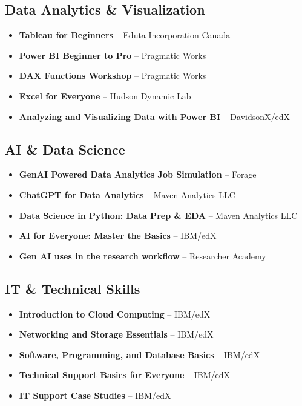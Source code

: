 \documentclass[a4paper,10pt]{article}
\begin{document}
\subsection{Data Analytics \& Visualization}
\begin{itemize}[noitemsep, leftmargin=*, topsep=0.2em]
    \item \textbf{Tableau for Beginners} -- Eduta Incorporation Canada
    \item \textbf{Power BI Beginner to Pro} -- Pragmatic Works
    \item \textbf{DAX Functions Workshop} -- Pragmatic Works
    \item \textbf{Excel for Everyone} -- Hudson Dynamic Lab
    \item \textbf{Analyzing and Visualizing Data with Power BI} -- DavidsonX/edX
\end{itemize}

\subsection{AI \& Data Science}
\begin{itemize}[noitemsep, leftmargin=*, topsep=0.2em]
    \item \textbf{GenAI Powered Data Analytics Job Simulation} -- Forage
    \item \textbf{ChatGPT for Data Analytics} -- Maven Analytics LLC
    \item \textbf{Data Science in Python: Data Prep \& EDA} -- Maven Analytics LLC
    \item \textbf{AI for Everyone: Master the Basics} -- IBM/edX
    \item \textbf{Gen AI uses in the research workflow} -- Researcher Academy
\end{itemize}

\subsection{IT \& Technical Skills}
\begin{itemize}[noitemsep, leftmargin=*, topsep=0.2em]
    \item \textbf{Introduction to Cloud Computing} -- IBM/edX
    \item \textbf{Networking and Storage Essentials} -- IBM/edX
    \item \textbf{Software, Programming, and Database Basics} -- IBM/edX
    \item \textbf{Technical Support Basics for Everyone} -- IBM/edX
    \item \textbf{IT Support Case Studies} -- IBM/edX
\end{itemize}
\end{document}
